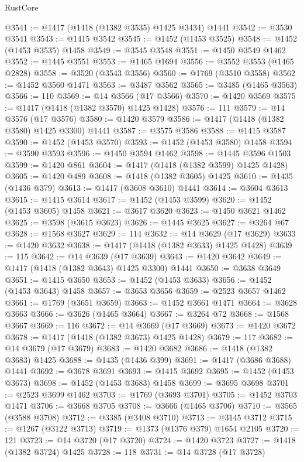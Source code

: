 \begin{lexlean}{RustCore}
\begin{coremodule}
@3541 := @1417 (@1418 (@1382 @3535) @1425 @3434) @1441
@3542 := @3530 @3541
@3543 := @1415 @3542
@3545 := @1452 (@1453 @3525)
@3548 := @1452 (@1453 @3535) @1458
@3549 := @3545 @3548
@3551 := @1450 @3549 @1462
@3552 := @1445 @3551
@3553 := @1465 @1694
@3556 := @3552 @3553 (@1465 @2828)
@3558 := @3520 (@3543 @3556)
@3560 := @1769 (@3510 @3558)
@3562 := @1452 @3560 @1471
@3563 := @3487 @3562
@3565 := @3485 (@1465 @3563)
@3566 := 110
@3569 := @14 @3566 (@17 @3566)
@3570 := @1420 @3569
@3575 := @1417 (@1418 (@1382 @3570) @1425 @1428)
@3576 := 111
@3579 := @14 @3576 (@17 @3576)
@3580 := @1420 @3579
@3586 := @1417 (@1418 (@1382 @3580) @1425 @3300) @1441
@3587 := @3575 @3586
@3588 := @1415 @3587
@3590 := @1452 (@1453 @3570)
@3593 := @1452 (@1453 @3580) @1458
@3594 := @3590 @3593
@3596 := @1450 @3594 @1462
@3598 := @1445 @3596 @1503
@3599 := @1420 @861
@3604 := @1417 (@1418 (@1382 @3599) @1425 @1428)
@3605 := @1420 @489
@3608 := @1418 (@1382 @3605) @1425
@3610 := @1435 (@1436 @379)
@3613 := @1417 (@3608 @3610) @1441
@3614 := @3604 @3613
@3615 := @1415 @3614
@3617 := @1452 (@1453 @3599)
@3620 := @1452 (@1453 @3605) @1458
@3621 := @3617 @3620
@3623 := @1450 @3621 @1462
@3625 := @3598 (@3615 @3623)
@3626 := @1445 @3625
@3627 := @3264 @67
@3628 := @1568 @3627
@3629 := 114
@3632 := @14 @3629 (@17 @3629)
@3633 := @1420 @3632
@3638 := @1417 (@1418 (@1382 @3633) @1425 @1428)
@3639 := 115
@3642 := @14 @3639 (@17 @3639)
@3643 := @1420 @3642
@3649 := @1417 (@1418 (@1382 @3643) @1425 @3300) @1441
@3650 := @3638 @3649
@3651 := @1415 @3650
@3653 := @1452 (@1453 @3633)
@3656 := @1452 (@1453 @3643) @1458
@3657 := @3653 @3656
@3659 := @2523 @3657 @1462
@3661 := @1769 (@3651 @3659)
@3663 := @1452 @3661 @1471
@3664 := @3628 @3663
@3666 := @3626 (@1465 @3664)
@3667 := @3264 @72
@3668 := @1568 @3667
@3669 := 116
@3672 := @14 @3669 (@17 @3669)
@3673 := @1420 @3672
@3678 := @1417 (@1418 (@1382 @3673) @1425 @1428)
@3679 := 117
@3682 := @14 @3679 (@17 @3679)
@3683 := @1420 @3682
@3686 := @1418 (@1382 @3683) @1425
@3688 := @1435 (@1436 @399)
@3691 := @1417 (@3686 @3688) @1441
@3692 := @3678 @3691
@3693 := @1415 @3692
@3695 := @1452 (@1453 @3673)
@3698 := @1452 (@1453 @3683) @1458
@3699 := @3695 @3698
@3701 := @2523 @3699 @1462
@3703 := @1769 (@3693 @3701)
@3705 := @1452 @3703 @1471
@3706 := @3668 @3705
@3708 := @3666 (@1465 @3706)
@3710 := @3565 (@3588 @3708)
@3712 := @3385 (@3408 @3710)
@3713 := @3145 @3712
@3715 := @1267 (@3122 @3713)
@3719 := @1373 (@1376 @379) @1654 @2105
@3720 := 121
@3723 := @14 @3720 (@17 @3720)
@3724 := @1420 @3723
@3727 := @1418 (@1382 @3724) @1425
@3728 := 118
@3731 := @14 @3728 (@17 @3728)

\end{coremodule}
\end{lexlean}
